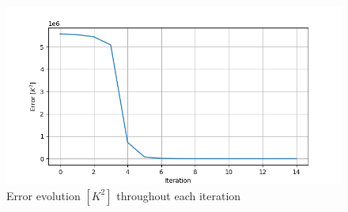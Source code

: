 \begin{figure}[H]
\centering
\includegraphics[scale=0.75]{images/Error_evolution.png}
\caption{Error evolution $[K^2]$ throughout each iteration}
\label{fig:Error Evolution}
\end{figure}